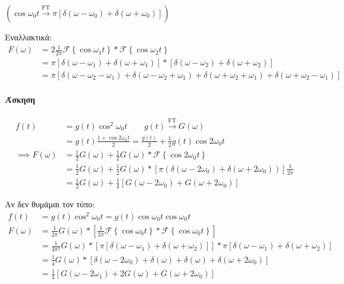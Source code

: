      \( \left( \cos\omega_0t \xrightarrow{\text{FT}}
     \pi\left[ \delta(\omega -\omega_0)+\delta(\omega+\omega_0) \right]
      \right) \)
     
     Εναλλακτικά:
     \begin{align*}
     F(\omega ) &= 2\frac{1}{2\pi}\mathscr F \left\lbrace \cos\omega_1 t \right\rbrace
     * \mathscr F\left\lbrace \cos\omega_2 t \right\rbrace \\
     &= \pi \left[ \delta(\omega -\omega_1)+\delta(\omega+\omega_1) \right]
     * \left[ \delta(\omega -\omega_2)+\delta(\omega+\omega_2) \right]
     \\ &= \pi \left[
     \delta(\omega-\omega_2-\omega_1) +\delta(\omega-\omega_2+\omega_1)
     +\delta(\omega+\omega_2+\omega_1)+\delta(\omega+\omega_2-\omega_1)
     \right]
     \end{align*}
     
     \paragraph{Άσκηση}
     \begin{align*}
     f(t) &= g(t) \cos^2 \omega_0 t \qquad g(t) \xrightarrow{\text{FT}} G(\omega )
     \\ &= g(t)\frac{1+\cos2\omega_0 t}{2} = \frac{g(t)}{2} + 
     \frac{1}{2}g(t)\cos2\omega_0 t \\
     \implies F(\omega ) &= \frac{1}{2}G(\omega )+\frac{1}{2}G(\omega )
     *\mathscr F\left\lbrace \cos2\omega_0 t \right\rbrace
     \\ &= \frac{1}{2}G(\omega )+\frac{1}{2}G(\omega ) *
     \left[ \pi\left(\delta(\omega-2\omega_0)+\delta(\omega+2\omega_0)\right) \right]
     \frac{1}{2\pi} \\ &= \frac{1}{2}G(\omega ) + \frac{1}{4} \left[
     G(\omega -2\omega_0)+G(\omega +2\omega_0)
     \right]
     \end{align*}
     
     Αν δεν θυμάμαι τον τύπο:
     \begin{align*}
     f(t) &= g(t)\cos^2\omega_0 t = g(t)\cos\omega_0 t\cos\omega_0 t \\
     F(\omega ) &= \frac{1}{2\pi}G(\omega)*\left[
     \frac{1}{2\pi}\mathscr F\left\lbrace \cos\omega_0t \right\rbrace
     *\mathscr F \left\lbrace \cos\omega_0 t \right\rbrace
     \right] \\ &= \frac{1}{4\pi^2} G(\omega ) * \left[
     \pi\left[ \delta(\omega -\omega_1)+\delta(\omega+\omega_2) \right]
     \right] * \pi\left[
     \delta(\omega-\omega_1)+\delta(\omega+\omega_2)
     \right] \\ &=
     \frac{1}{4}G(\omega ) * \left[
     \delta(\omega -2\omega_0)+\delta(\omega)+\delta(\omega)+\delta(\omega+2\omega_0)
     \right]
     \\ &= \frac{1}{4}\left[
     G(\omega -2\omega_1)+2G(\omega )+G(\omega +2\omega_0)
     \right]
     \end{align*}
     
